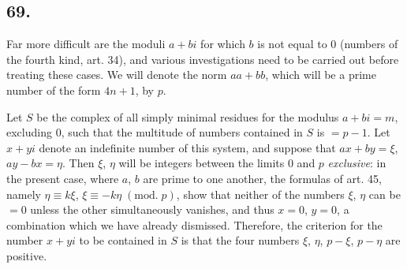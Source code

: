 \documentclass[twoside,12pt]{memoir}
\renewcommand{\pmod}[1]{\;(\textrm{mod.}\;#1)}
\begin{document}
\subsection*{69.}

Far more difficult are the moduli \(a+b i\) for which \(b\) is not equal to \(0\) (numbers of the fourth kind, art. 34), and various investigations need to be carried out before treating these cases. We will denote the norm \(a a+b b\), which will be a prime number of the form \(4n+1\), by \(p\).

Let \(S\) be the complex of all simply minimal residues for the modulus \(a+bi=m\), excluding \(0\), such that the multitude of numbers contained in \(S\) is \(=p-1\). Let \(x+yi\) denote an indefinite number of this system, and suppose that \(ax+by=\xi\), \(ay-bx=\eta\). Then \(\xi\), \(\eta\) will be integers  between the limits \(0\) and \(p\) \textit{exclusive}: in the present case, where \(a\), \(b\) are prime to one another, the formulas of art. 45, namely \(\eta \equiv k \xi\), \(\xi \equiv-k \eta\pmod{p}\), show that neither of the numbers \(\xi\), \(\eta\) can be \(=0\) unless the other simultaneously vanishes, and thus \(x=0\), \(y=0\), a combination which we have already dismissed. Therefore, the criterion for the number \(x+yi\) to be contained in \(S\) is that the four numbers \(\xi\), \(\eta\), \(p-\xi\), \(p-\eta\) are positive.
%
\end{document}
